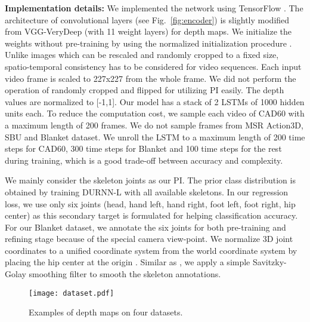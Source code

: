 \documentclass[10pt,twocolumn,letterpaper]{article}
\begin{document}
\noindent \textbf{Implementation details:} We implemented the network using TensorFlow \cite{tensorflow}. The architecture of convolutional layers (see Fig.~\ref{fig:encoder}) is slightly modified from VGG-VeryDeep \cite{Simonyan15c} (with 11 weight layers) for depth maps.  We initialize the weights without pre-training by using the normalized initialization procedure \cite{glorot2010understanding}. Unlike images which can be rescaled and randomly cropped to a fixed size, spatio-temporal consistency has to be considered for video sequences. Each input video frame is scaled to 227x227 from the whole frame. We did not perform the operation of randomly cropped and flipped for utilizing PI easily. The depth values are normalized to [-1,1]. Our model has a stack of 2 LSTMs of 1000 hidden units each. To reduce the computation cost, we sample each video of CAD60 with a maximum length of 200 frames. We do not sample frames from MSR Action3D, SBU and Blanket dataset. We unroll the LSTM to a maximum length of 200 time steps for CAD60, 300 time steps for Blanket and 100 time steps for the rest during training, which is a good trade-off between accuracy and complexity.

We mainly consider the skeleton joints as our PI. The prior class distribution is obtained by training DURNN-L \cite{Yong_cvpr_2015} with all available skeletons. In our regression loss, we use only six joints (\ie head, hand left, hand right, foot left, foot right, hip center) as this secondary target is formulated for helping classification accuracy. For our Blanket dataset, we annotate the six joints for both pre-training and refining stage because of the special camera view-point. We normalize 3D joint coordinates to a unified coordinate system from the world coordinate system by placing the hip center at the origin \cite{Vemulapalli_cvpr_2014}. Similar as \cite{Yong_cvpr_2015},  we apply a simple Savitzky-Golay smoothing filter to smooth the skeleton annotations.






\begin{figure}[t]
\centering
   \texttt{[image: dataset.pdf]}

\caption{Examples of depth maps on four datasets.}
\label{fig:data}
\end{figure}








\vspace{-0.1cm}
\end{document}

